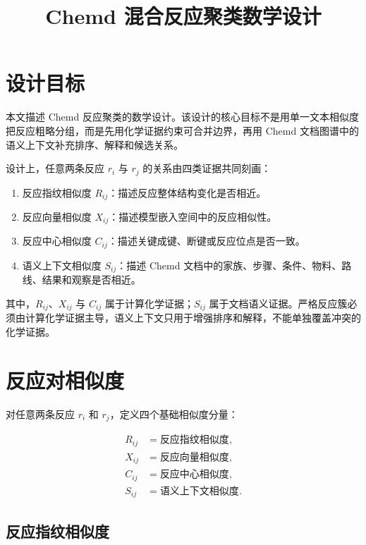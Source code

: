 \documentclass[11pt]{article}
\title{Chemd 混合反应聚类数学设计}
\author{}
\date{}
\numberwithin{equation}{section}
\begin{document}
\maketitle

\section{设计目标}

本文描述 Chemd 反应聚类的数学设计。该设计的核心目标不是用单一文本相似度把反应粗略分组，而是先用化学证据约束可合并边界，再用 Chemd 文档图谱中的语义上下文补充排序、解释和候选关系。

设计上，任意两条反应 \(r_i\) 与 \(r_j\) 的关系由四类证据共同刻画：

\begin{enumerate}[label=\arabic*.]
  \item 反应指纹相似度 \(R_{ij}\)：描述反应整体结构变化是否相近。
  \item 反应向量相似度 \(X_{ij}\)：描述模型嵌入空间中的反应相似性。
  \item 反应中心相似度 \(C_{ij}\)：描述关键成键、断键或反应位点是否一致。
  \item 语义上下文相似度 \(S_{ij}\)：描述 Chemd 文档中的家族、步骤、条件、物料、路线、结果和观察是否相近。
\end{enumerate}

其中，\(R_{ij}\)、\(X_{ij}\) 与 \(C_{ij}\) 属于计算化学证据；\(S_{ij}\) 属于文档语义证据。严格反应簇必须由计算化学证据主导，语义上下文只用于增强排序和解释，不能单独覆盖冲突的化学证据。

\section{反应对相似度}

对任意两条反应 \(r_i\) 和 \(r_j\)，定义四个基础相似度分量：

\begin{equation}
\begin{aligned}
R_{ij} & = \text{反应指纹相似度}, \\
X_{ij} & = \text{反应向量相似度}, \\
C_{ij} & = \text{反应中心相似度}, \\
S_{ij} & = \text{语义上下文相似度}.
\end{aligned}
\end{equation}

\subsection{反应指纹相似度}
\end{document}

